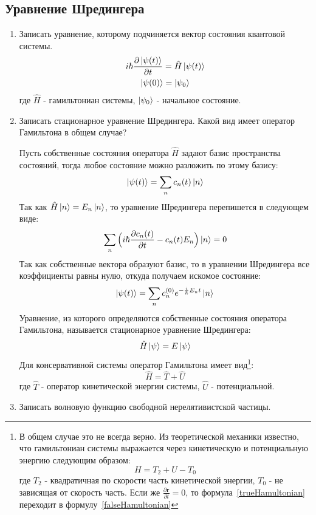 \documentclass{article}
\begin{document}
\subsection*{Уравнение Шредингера}
\begin{enumerate}
	\item {Записать уравнение, которому подчиняется вектор состояния квантовой системы.} 
	\begin{gather}
			i \hbar \frac{\partial \ket{\psi (t)}}{\partial t} = \hat{H} \ket{\psi (t)} \label{shrodingerEquation}\\
		\ket{\psi(0)} = \ket{\psi_0}
	\end{gather}
	где $\hat{H}$ - гамильтониан системы, $\ket{\psi_0}$ - начальное состояние.
	
	\item {Записать стационарное уравнение Шредингера. Какой вид имеет оператор Гамильтона в общем случае?}
	
	Пусть собственные состояния оператора $\hat{H}$ задают базис пространства состояний, тогда любое состояние можно разложить по этому базису:
	\begin{equation}
		\ket{\psi(t)} = \sum\limits_n c_n (t) \ket{n} \label{basisDecomposition}
	\end{equation}
	Так как $\hat{H}\ket{n} = E_n \ket{n}$, то уравнение Шредингера перепишется в следующем виде:
	\begin{equation}
		\sum\limits_n \Big(i\hbar \frac{\partial c_n(t)}{\partial t} - c_n(t) E_n \Big) \ket{n} = 0
	\end{equation}
	Так как собственные вектора образуют базис, то в уравнении Шредингера все коэффициенты равны нулю, откуда получаем искомое состояние:
	\begin{equation}
		\ket{\psi(t)} = \sum\limits_n c_n^{(0)} e^{-\frac{i}{\hbar} E_n t} \ket{n}
	\end{equation}
	Уравнение, из которого определяются собственные состояния оператора Гамильтона, называется {стационарное уравнение Шредингера}:
	\begin{equation}
		\hat{H} \ket{\psi} = E \ket{\psi}
	\end{equation}
	Для консервативной системы оператор Гамильтона имеет вид\footnote{В общем случае это не всегда верно. Из теоретической механики известно, что гамильтониан системы выражается через кинетическую и потенциальную энергию следующим образом:
	\begin{equation}
		H = T_2 + U - T_0 \label{trueHamultonian}
	\end{equation}
	где $T_2$ - квадратичная по скорости часть кинетической энергии, $T_0$ - не зависящая от скорость часть. Если же $\frac{\partial \textbf{r}}{\partial t} = 0$, то формула~\eqref{trueHamultonian} переходит в формулу~\eqref{falseHamultonian}
	}:
	\begin{equation}
		\hat{H} = \hat{T} + \hat{U} \label{falseHamultonian}
	\end{equation}
	где $\hat{T}$ - оператор кинетической энергии системы, $\hat{U}$ - потенциальной.
	\item {Записать волновую функцию свободной нерелятивистской частицы.}
	

\end{enumerate}
\end{document}
